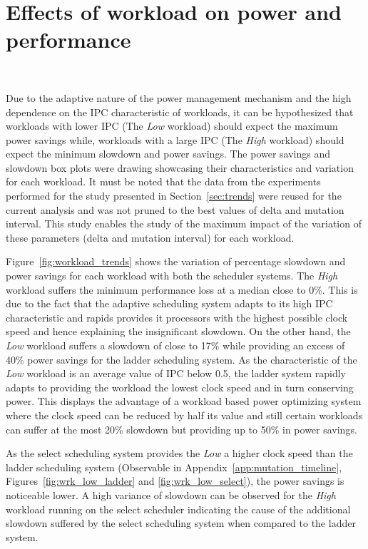\section{Effects of workload on power and performance}~\label{sec:wrk_trends}

Due to the adaptive nature of the power management mechanism and the high dependence
on the IPC characteristic of workloads, it can be hypothesized
that workloads with lower IPC (The \textit{Low} workload) should expect the maximum
power savings while, workloads with a large IPC (The \textit{High} workload) should
expect the minimum slowdown and power savings.
The power savings and slowdown box plots were drawing showcasing their characteristics and 
variation for each workload. It must be noted that the data from the experiments 
performed for the study presented in Section~\ref{sec:trends} were reused for the 
current analysis and was not pruned to the best values of delta and mutation interval. 
This study enables the study of the maximum impact of the variation of these parameters
(delta and mutation interval) for each workload. 

Figure~\ref{fig:workload_trends} shows the variation of percentage slowdown and power savings 
for each workload with both the scheduler systems. The \textit{High} workload 
suffers the minimum performance loss at a median close to 0\%. This is due to the fact 
that the adaptive scheduling system adapts to its high IPC characteristic and rapids 
provides it processors with the highest possible clock speed and hence explaining 
the insignificant slowdown. On the other hand, the \textit{Low} workload suffers a slowdown
of close to 17\% while providing an excess of 40\% power savings for the ladder scheduling
system. As the characteristic of the \textit{Low} workload is an average value of IPC below 0.5, 
the ladder system rapidly adapts to providing the workload the lowest clock speed and 
in turn conserving power. This displays the advantage of a workload based power optimizing 
system where the clock speed can be reduced by half its value and still certain workloads
can suffer at the most 20\% slowdown but providing up to 50\% in power savings. 

As the select scheduling system provides the \textit{Low} a higher clock speed than the 
ladder scheduling system (Observable in Appendix~\ref{app:mutation_timeline}, 
Figures~\ref{fig:wrk_low_ladder} and \ref{fig:wrk_low_select}), the power savings is 
noticeable lower. A high variance of slowdown can be observed for the \textit{High} 
workload running on the select scheduler indicating the cause of the additional slowdown
suffered by the select scheduling system when compared to the ladder system.

